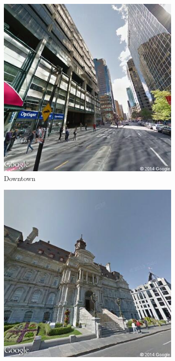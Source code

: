 \documentclass{acm_proc_article-sp}
\begin{document}
\begin{figure}[h!]
\centering
	\begin{subfigure}[b]{0.3\linewidth}
		\includegraphics[width=\linewidth]{downtown.png}
		\caption{Downtown}
		\label{fig:downtown}
	\end{subfigure}
	\begin{subfigure}[b]{0.3\linewidth}
		\includegraphics[width=\linewidth]{oldmontreal.png}

\end{subfigure}
\end{figure}
\end{document}
